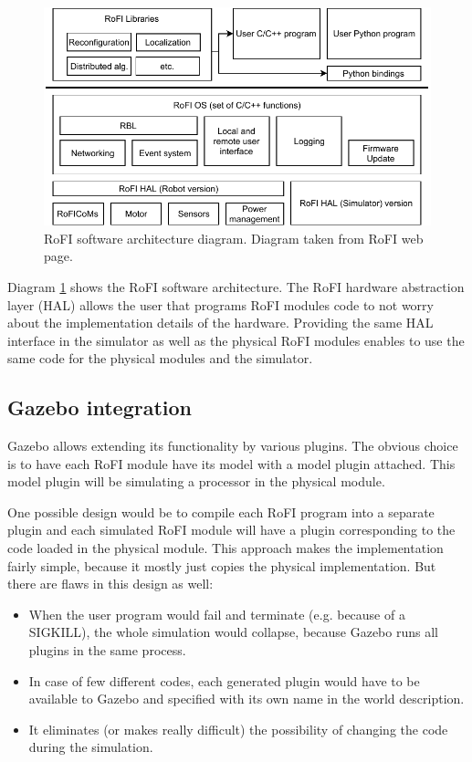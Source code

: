 \documentclass[
  digital, %
  table,   %
  oneside, %
  nolof,     %
  nolot,     %
]{fithesis3}
\begin{document}
\begin{figure}
    \centering
    \includegraphics[width=\linewidth]{rofi_architecture.pdf}
    \caption{RoFI software architecture diagram. Diagram taken from RoFI web page\cite{rofi-web}.}
    \label{fig:hal_diagram}
\end{figure}

Diagram \ref{fig:hal_diagram} shows the RoFI software architecture.
The RoFI hardware abstraction layer (HAL) allows the user that programs RoFI modules code to not worry about the implementation details of the hardware.
Providing the same HAL interface in the simulator as well as the physical RoFI modules enables to use the same code for the physical modules and the simulator.

\subsection{Gazebo integration}

Gazebo allows extending its functionality by various plugins.
The obvious choice is to have each RoFI module have its model with a model plugin attached.
This model plugin will be simulating a processor in the physical module.

One possible design would be to compile each RoFI program into a separate plugin and each simulated RoFI module will have a plugin corresponding to the code loaded in the physical module.
This approach makes the implementation fairly simple, because it mostly just copies the physical implementation.
But there are flaws in this design as well:
\begin{itemize}
    \item When the user program would fail and terminate (e.g. because of a SIGKILL), the whole simulation would collapse, because Gazebo runs all plugins in the same process.
    \item In case of few different codes, each generated plugin would have to be available to Gazebo and specified with its own name in the world description.
    \item It eliminates (or makes really difficult) the possibility of changing the code during the simulation.
\end{itemize}
\end{document}
